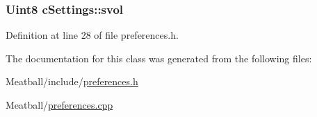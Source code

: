 \hypertarget{classc_settings_a21e639229b63224feb0d5a1667263f22}{
\subsubsection[{svol}]{\setlength{\rightskip}{0pt plus 5cm}Uint8 c\-Settings\-::svol}}\label{classc_settings_a21e639229b63224feb0d5a1667263f22}


Definition at line 28 of file preferences.\-h.



The documentation for this class was generated from the following files\-:\begin{DoxyCompactItemize}
\item 
Meatball/include/\hyperlink{preferences_8h}{preferences.\-h}\item 
Meatball/\hyperlink{preferences_8cpp}{preferences.\-cpp}\end{DoxyCompactItemize}
